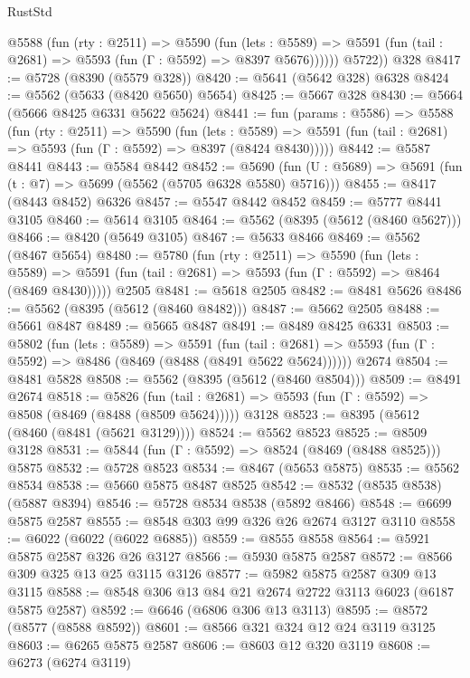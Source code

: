 \begin{lexlean}{RustStd}
\begin{coremodule}
          @5588
            (fun (rty : @2511) =>
            @5590
              (fun (lets : @5589) =>
              @5591 (fun (tail : @2681) => @5593 (fun (Γ : @5592) => @8397 @5676))))))
        @5722))
    @328
@8417 := @5728 (@8390 (@5579 @328))
@8420 := @5641 (@5642 @328) @6328
@8424 := @5562 (@5633 (@8420 @5650) @5654)
@8425 := @5667 @328
@8430 := @5664 (@5666 @8425 @6331 @5622 @5624)
@8441 := fun (params : @5586) =>
  @5588
    (fun (rty : @2511) =>
    @5590
      (fun (lets : @5589) =>
      @5591 (fun (tail : @2681) => @5593 (fun (Γ : @5592) => @8397 (@8424 @8430)))))
@8442 := @5587 @8441
@8443 := @5584 @8442
@8452 := @5690 (fun (U : @5689) => @5691 (fun (t : @7) => @5699 (@5562 (@5705 @6328 @5580) @5716)))
@8455 := @8417 (@8443 @8452) @6326
@8457 := @5547 @8442 @8452
@8459 := @5777 @8441 @3105
@8460 := @5614 @3105
@8464 := @5562 (@8395 (@5612 (@8460 @5627)))
@8466 := @8420 (@5649 @3105)
@8467 := @5633 @8466
@8469 := @5562 (@8467 @5654)
@8480 := @5780
    (fun (rty : @2511) =>
    @5590
      (fun (lets : @5589) =>
      @5591 (fun (tail : @2681) => @5593 (fun (Γ : @5592) => @8464 (@8469 @8430)))))
    @2505
@8481 := @5618 @2505
@8482 := @8481 @5626
@8486 := @5562 (@8395 (@5612 (@8460 @8482)))
@8487 := @5662 @2505
@8488 := @5661 @8487
@8489 := @5665 @8487
@8491 := @8489 @8425 @6331
@8503 := @5802
    (fun (lets : @5589) =>
    @5591
      (fun (tail : @2681) => @5593 (fun (Γ : @5592) => @8486 (@8469 (@8488 (@8491 @5622 @5624))))))
    @2674
@8504 := @8481 @5828
@8508 := @5562 (@8395 (@5612 (@8460 @8504)))
@8509 := @8491 @2674
@8518 := @5826
    (fun (tail : @2681) => @5593 (fun (Γ : @5592) => @8508 (@8469 (@8488 (@8509 @5624)))))
    @3128
@8523 := @8395 (@5612 (@8460 (@8481 (@5621 @3129))))
@8524 := @5562 @8523
@8525 := @8509 @3128
@8531 := @5844 (fun (Γ : @5592) => @8524 (@8469 (@8488 @8525))) @5875
@8532 := @5728 @8523
@8534 := @8467 (@5653 @5875)
@8535 := @5562 @8534
@8538 := @5660 @5875 @8487 @8525
@8542 := @8532 (@8535 @8538) (@5887 @8394)
@8546 := @5728 @8534 @8538 (@5892 @8466)
@8548 := @6699 @5875 @2587
@8555 := @8548 @303 @99 @326 @26 @2674 @3127 @3110
@8558 := @6022 (@6022 (@6022 @6885))
@8559 := @8555 @8558
@8564 := @5921 @5875 @2587 @326 @26 @3127
@8566 := @5930 @5875 @2587
@8572 := @8566 @309 @325 @13 @25 @3115 @3126
@8577 := @5982 @5875 @2587 @309 @13 @3115
@8588 := @8548 @306 @13 @84 @21 @2674 @2722 @3113 @6023 (@6187 @5875 @2587)
@8592 := @6646 (@6806 @306 @13 @3113)
@8595 := @8572 (@8577 (@8588 @8592))
@8601 := @8566 @321 @324 @12 @24 @3119 @3125
@8603 := @6265 @5875 @2587
@8606 := @8603 @12 @320 @3119
@8608 := @6273 (@6274 @3119)

\end{coremodule}
\end{lexlean}
